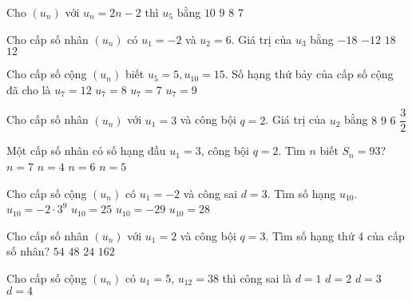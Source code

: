\begin{ex}
Cho $(u_n)$ với $u_n=2n-2$ thì $u_5$ bằng
\choice
{$10$}
{$9$}
{\True $8$}
{$7$}
\end{ex}
\begin{ex}
Cho cấp số nhân $(u_n)$ có $u_1=-2$ và $u_2=6$. Giá trị của $u_3$ bằng
\choice
{\True $-18$}
{$-12$}
{$18$}
{$12$}
\end{ex}
\begin{ex}
Cho cấp số cộng $(u_n)$ biết $u_5=5, u_{10}=15$. Số hạng thứ bảy của cấp số cộng đã cho là
\choice
{$u_7=12$}
{$u_7=8$}
{$u_7=7$}
{\True $u_7=9$}
\end{ex}
\begin{ex}
Cho cấp số nhân $(u_n)$ với $u_1=3$ và công bội $q=2$. Giá trị của $u_2$ bằng
\choice
{$8$}
{$9$}
{\True $6$}
{$\dfrac{3}{2}$}
\end{ex}
\begin{ex}
Một cấp số nhân có số hạng đầu $u_1=3$, công bội $q=2$. Tìm $n$ biết $S_n=93$?
\choice
{$n=7$}
{$n=4$}
{$n=6$}
{\True $n=5$}
\end{ex}
\begin{ex}
Cho cấp số cộng $(u_n)$ có $u_1=-2$ và công sai $d=3$. Tìm số hạng $u_{10}$.
\choice
{$u_{10}=-2 \cdot 3^9$}
{\True $u_{10}=25$}
{$u_{10}=-29$}
{$u_{10}=28$}
\end{ex}
\begin{ex}
Cho cấp số nhân $(u_n)$ với $u_1=2$ và công bội $q=3$. Tìm số hạng thứ $4$ của cấp số nhân?
\choice
{\True $54$}
{$48$}
{$24$}
{$162$}
\end{ex}
\begin{ex}
Cho cấp số cộng $(u_n)$ có $u_1=5$, $u_{12}=38$ thì công sai là
\choice
{$d=1$}
{$d=2$}
{\True $d=3$}
{$d=4$}
\end{ex}
